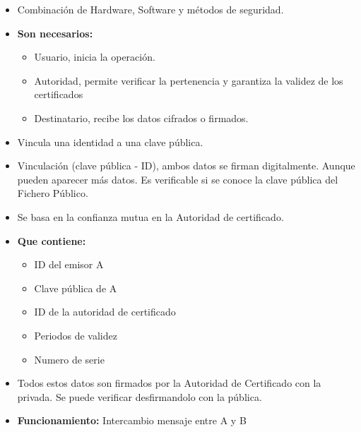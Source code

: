 \documentclass[12pt, twoside, openright]{report} %
\begin{document}
  \begin{itemize}
  \item Combinación de Hardware, Software y métodos de seguridad.
    
  \item \textbf{Son necesarios:}
    

    \begin{itemize}
    \item Usuario, inicia la operación.
      
    \item Autoridad, permite verificar la pertenencia y garantiza la validez
      de los certificados
      
    \item Destinatario, recibe los datos cifrados o firmados.
      
    \end{itemize}
  \item Vincula una identidad a una clave pública.
    
  \item Vinculación (clave pública - ID), ambos datos se firman
    digitalmente. Aunque pueden aparecer más datos. Es verificable si se
    conoce la clave pública del Fichero Público.
    
  \item Se basa en la confianza mutua en la Autoridad de certificado.
    
  \item \textbf{Que contiene:}
    

    \begin{itemize}
    \item ID del emisor A
      
    \item Clave pública de A
      
    \item ID de la autoridad de certificado
      
    \item Periodos de validez
      
    \item Numero de serie
      
    \end{itemize}
  \item Todos estos datos son firmados por la Autoridad de Certificado con
    la privada. Se puede verificar desfirmandolo con la pública.
    
  \item \textbf{Funcionamiento:} Intercambio mensaje entre A y B
    


\end{itemize}
\end{document}
